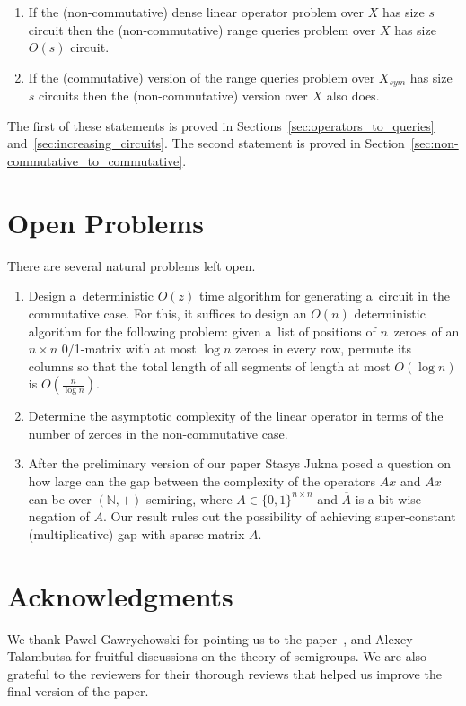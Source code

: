 \documentclass{toc}
\begin{document}
\begin{enumerate}
	\item If the (non-commutative) dense linear operator problem over $X$ has size $s$
	circuit then the (non-commutative) range queries problem over $X$ has size
	$O(s)$ circuit.
	\item If the (commutative) version of the range queries problem over $X_{sym}$ has
	size $s$ circuits then the (non-commutative) version over $X$ also does.
\end{enumerate}

The first of these statements is proved in Sections~\ref{sec:operators_to_queries} and~\ref{sec:increasing_circuits}.
The second statement is proved in Section~\ref{sec:non-commutative_to_commutative}.



\section{Open Problems}
There are several natural problems left open.
\begin{enumerate}
\item Design a~deterministic $O(z)$ time algorithm for generating
a~circuit in the commutative case.
For this, it suffices to design an $O(n)$ deterministic algorithm for the
following problem: given a~list of positions of $n$~zeroes of an $n \times n$
0/1-matrix with at most $\log n$ zeroes in every row, permute its columns so
that the total length of all segments of length at most $O(\log n)$ is
$O(\frac{n}{\log n})$.
\item Determine the asymptotic complexity of the linear operator in terms of the number of zeroes in the non-commutative case.
\item After the preliminary version of our paper Stasys Jukna posed a question on how large can the gap between the complexity of the operators $Ax$ and $\overline{A}x$ can be over $(\mathbb{N},+)$ semiring, where $A \in \{0,1\}^{n\times n}$ and $\overline{A}$ is a bit-wise negation of $A$. Our result rules out the possibility of achieving super-constant (multiplicative) gap with sparse matrix $A$.

\end{enumerate}


\section*{Acknowledgments}
We thank Pawel Gawrychowski for pointing us to the
paper~\cite{DBLP:journals/ijcga/ChazelleR91}, and Alexey Talambutsa for
fruitful discussions on the theory of semigroups.
We are also grateful to the reviewers for their thorough reviews that helped us
improve the final version of the paper.
\end{document}
